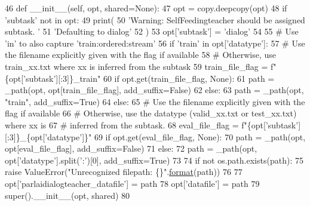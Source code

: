 \begin{DoxyCode}
46     \textcolor{keyword}{def }\_\_init\_\_(self, opt, shared=None):
47         opt = copy.deepcopy(opt)
48         \textcolor{keywordflow}{if} \textcolor{stringliteral}{'subtask'} \textcolor{keywordflow}{not} \textcolor{keywordflow}{in} opt:
49             print(
50                 \textcolor{stringliteral}{'Warning: SelfFeedingteacher should be assigned subtask. '}
51                 \textcolor{stringliteral}{'Defaulting to dialog'}
52             )
53             opt[\textcolor{stringliteral}{'subtask'}] = \textcolor{stringliteral}{'dialog'}
54 
55         \textcolor{comment}{# Use 'in' to also capture 'train:ordered:stream'}
56         \textcolor{keywordflow}{if} \textcolor{stringliteral}{'train'} \textcolor{keywordflow}{in} opt[\textcolor{stringliteral}{'datatype'}]:
57             \textcolor{comment}{# Use the filename explicitly given with the flag if available}
58             \textcolor{comment}{# Otherwise, use train\_xx.txt where xx is inferred from the subtask}
59             train\_file\_flag = f\textcolor{stringliteral}{"\{opt['subtask'][:3]\}\_train"}
60             \textcolor{keywordflow}{if} opt.get(train\_file\_flag, \textcolor{keywordtype}{None}):
61                 path = \_path(opt, opt[train\_file\_flag], add\_suffix=\textcolor{keyword}{False})
62             \textcolor{keywordflow}{else}:
63                 path = \_path(opt, \textcolor{stringliteral}{"train"}, add\_suffix=\textcolor{keyword}{True})
64         \textcolor{keywordflow}{else}:
65             \textcolor{comment}{# Use the filename explicitly given with the flag if available}
66             \textcolor{comment}{# Otherwise, use the datatype (valid\_xx.txt or test\_xx.txt) where xx is}
67             \textcolor{comment}{# inferred from the subtask.}
68             eval\_file\_flag = f\textcolor{stringliteral}{"\{opt['subtask'][:3]\}\_\{opt['datatype']\}"}
69             \textcolor{keywordflow}{if} opt.get(eval\_file\_flag, \textcolor{keywordtype}{None}):
70                 path = \_path(opt, opt[eval\_file\_flag], add\_suffix=\textcolor{keyword}{False})
71             \textcolor{keywordflow}{else}:
72                 path = \_path(opt, opt[\textcolor{stringliteral}{'datatype'}].split(\textcolor{stringliteral}{':'})[0], add\_suffix=\textcolor{keyword}{True})
73 
74         \textcolor{keywordflow}{if} \textcolor{keywordflow}{not} os.path.exists(path):
75             \textcolor{keywordflow}{raise} ValueError(\textcolor{stringliteral}{"Unrecognized filepath: \{\}"}.\hyperlink{namespaceparlai_1_1chat__service_1_1services_1_1messenger_1_1shared__utils_a32e2e2022b824fbaf80c747160b52a76}{format}(path))
76 
77         opt[\textcolor{stringliteral}{'parlaidialogteacher\_datafile'}] = path
78         opt[\textcolor{stringliteral}{'datafile'}] = path
79         super().\_\_init\_\_(opt, shared)
80 
\end{DoxyCode}


